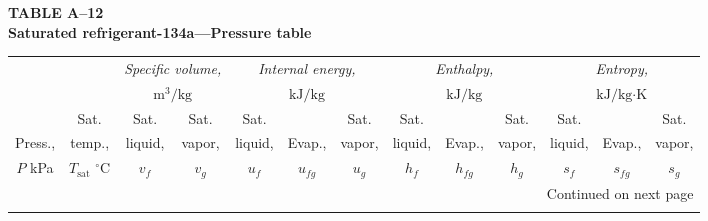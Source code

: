 \documentclass[12pt,a3paper]{article}
\begin{document}
\begin{enumerate}
\noindent\textbf{\Large TABLE A--12} \\
\noindent\textbf{\large Saturated refrigerant-134a---Pressure table}
\vspace{0.3cm}

\begin{center}
\small
\begin{longtable}{c c c c c c c c c c c c c}
\toprule\toprule
& & \multicolumn{2}{c}{\textit{Specific volume,}} & \multicolumn{3}{c}{\textit{Internal energy,}} & \multicolumn{3}{c}{\textit{Enthalpy,}} & \multicolumn{3}{c}{\textit{Entropy,}} \\
& & \multicolumn{2}{c}{$\text{m}^3\text{/kg}$} & \multicolumn{3}{c}{$\text{kJ/kg}$} & \multicolumn{3}{c}{$\text{kJ/kg}$} & \multicolumn{3}{c}{$\text{kJ/kg}\cdot\text{K}$} \\
\cmidrule(lr){3-4} \cmidrule(lr){5-7} \cmidrule(lr){8-10} \cmidrule(lr){11-13}
& Sat. & Sat. & Sat. & Sat. & & Sat. & Sat. & & Sat. & Sat. & & Sat. \\
Press., & temp., & liquid, & vapor, & liquid, & Evap., & vapor, & liquid, & Evap., & vapor, & liquid, & Evap., & vapor, \\
$P$ kPa & $T_{\text{sat}}$ $^\circ\text{C}$ & $v_f$ & $v_g$ & $u_f$ & $u_{fg}$ & $u_g$ & $h_f$ & $h_{fg}$ & $h_g$ & $s_f$ & $s_{fg}$ & $s_g$ \\
\midrule
\endhead

\midrule
\multicolumn{13}{r}{{Continued on next page}} \\
\bottomrule
\endfoot

\bottomrule\bottomrule
\endlastfoot


\end{longtable}
\end{center}
\end{enumerate}
\end{document}
